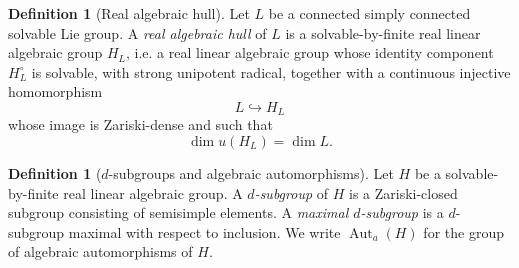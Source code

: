\documentclass[reqno]{amsart}
\numberwithin{equation}{section}
\theoremstyle{definition}
\newtheorem{definition}[theorem]{Definition}
\theoremstyle{remark}
\DeclareMathOperator{\Aut}{Aut}
\begin{document}
\begin{definition}[Real algebraic hull]\label{def:real-algebraic-hull}
Let $L$ be a connected simply connected solvable Lie group.
A \emph{real algebraic hull} of $L$ is a solvable-by-finite real linear
algebraic group $H_L$, i.e. a real linear algebraic group whose identity
component $H_L^\circ$ is solvable, with strong unipotent radical, together
with a continuous injective homomorphism
\[
L\hookrightarrow H_L
\]
whose image is Zariski-dense and such that
\[
\dim u(H_L)=\dim L.
\]\end{definition}

\begin{definition}[$d$-subgroups and algebraic automorphisms]
Let $H$ be a solvable-by-finite real linear algebraic group.
A \emph{$d$-subgroup} of $H$ is a Zariski-closed subgroup consisting of
semisimple elements. A \emph{maximal $d$-subgroup} is a $d$-subgroup maximal
with respect to inclusion. We write $\Aut_a(H)$ for the group of algebraic
automorphisms of $H$.
\end{definition}
\end{document}
